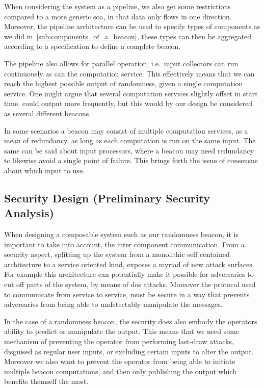 When considering the system as a pipeline, we also get some restrictions compared to a more generic \gls{soa}, in that data only flows in one direction.
Moreover, the pipeline architecture can be used to specify types of components as we did in~\vref{sub:components_of_a_beacon}, these types can then be aggregated according to a specification to define a complete beacon.

The pipeline also allows for parallel operation, i.e.\ input collectors can run continuously as can the computation service.
This effectively means that we can reach the highest possible output of randomness, given a single computation service.
One might argue that several computation services slightly offset in start time, could output more frequently, but this would by our design be considered as several different beacons.

In some scenarios a beacon may consist of multiple computation services, as a mean of redundancy, as long as each computation is run on the same input.
The same can be said about input processors, where a beacon may need redundancy to likewise avoid a single point of failure.
This brings forth the issue of consensus about which input to use.

\subsection{Security Design (Preliminary Security Analysis)}
When designing a composable system such as our randomness beacon, it is important to take into account, the inter component communication.
From a security aspect, splitting up the system from a monolithic self contained architecture to a service oriented kind, exposes a myriad of new attack surfaces.
For example this architecture can potentially make it possible for adversaries to cut off parts of the system, by means of \gls{dos} attacks.
Moreover the protocol used to communicate from service to service, must be secure in a way that prevents adversaries from being able to undetectably manipulate the messages.


In the case of a randomness beacon, the security does also embody the operators ability to predict or manipulate the output.
This means that we need some mechanism of preventing the operator from performing last-draw attacks, disguised as regular user inputs, or excluding certain inputs to alter the output.
Moreover we also want to prevent the operator from being able to initiate multiple beacon computations, and then only publishing the output which benefits themself the most.

